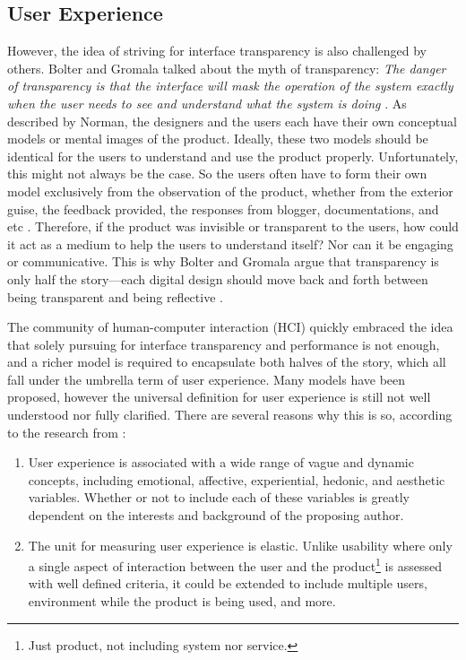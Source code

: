 \documentclass{acm_proc_article-sp}
\begin{document}
\subsection{User Experience}
However, the idea of striving for interface transparency is also
challenged by others. Bolter and Gromala talked about the myth of
transparency: \textit{The danger of transparency is that the interface
  will mask the operation of the system exactly when the user needs to
  see and understand what the system is doing}
\citep{windows:bolter}. As described by Norman, the designers and the
users each have their own conceptual models or mental images of the
product. Ideally, these two models should be identical for the users
to understand and use the product properly. Unfortunately, this might
not always be the case. So the users often have to form their own
model exclusively from the observation of the product, whether from
the exterior guise, the feedback provided, the responses from blogger,
documentations, and etc \citep{design:norman}. Therefore, if the
product was invisible or transparent to the users, how could it act as
a medium to help the users to understand itself? Nor can it be
engaging or communicative. This is why Bolter and Gromala argue that
transparency is only half the story---each digital design should move
back and forth between being transparent and being reflective
\citep{windows:bolter}.

The community of human-computer interaction (HCI) quickly embraced the
idea that solely pursuing for interface transparency and performance
is not enough, and a richer model is required to encapsulate both
halves of the story, which all fall under the umbrella term of user
experience. Many models have been proposed, however the universal
definition for user experience is still not well understood nor fully
clarified. There are several reasons why this is so, according to the
research from \citet{ux:law}:
\begin{enumerate}
  \item User experience is associated with a wide range of vague and
    dynamic concepts, including emotional, affective, experiential,
    hedonic, and aesthetic variables. Whether or not to include each
    of these variables is greatly dependent on the interests and
    background of the proposing author.
  \item The unit for measuring user experience is elastic. Unlike
    usability where only a single aspect of interaction between the
    user and the product\footnote{Just product, not including system
      nor service.} is assessed with well defined criteria, it could
    be extended to include multiple users, environment while the
    product is being used, and more.
\end{enumerate}
\end{document}
